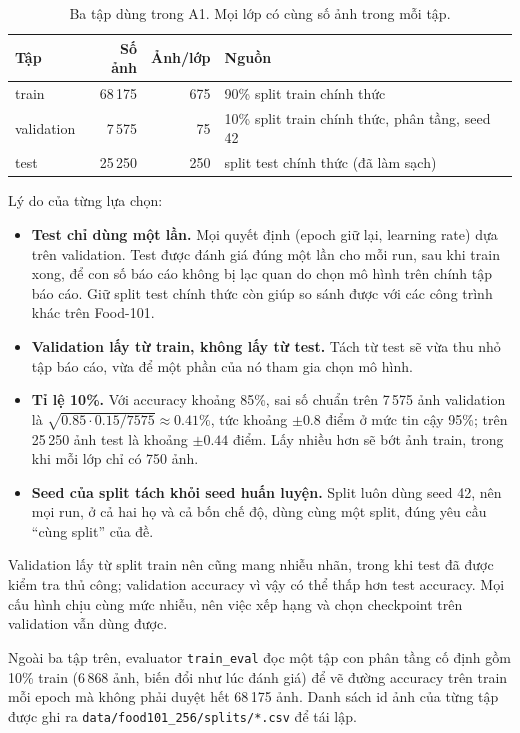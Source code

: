 \begin{table}[htbp]
\centering
\caption{Ba tập dùng trong A1. Mọi lớp có cùng số ảnh trong mỗi tập.}
\label{tab:a1-split}
\small
\begin{tabular}{lrrl}
\toprule
Tập & Số ảnh & Ảnh/lớp & Nguồn \\
\midrule
train & 68\,175 & 675 & 90\% split train chính thức \\
validation & 7\,575 & 75 & 10\% split train chính thức, phân tầng, seed 42 \\
test & 25\,250 & 250 & split test chính thức (đã làm sạch) \\
\bottomrule
\end{tabular}
\end{table}

Lý do của từng lựa chọn:
\begin{itemize}
\item \textbf{Test chỉ dùng một lần.} Mọi quyết định (epoch giữ lại, learning rate) dựa trên validation. Test được đánh giá đúng một lần cho mỗi run, sau khi train xong, để con số báo cáo không bị lạc quan do chọn mô hình trên chính tập báo cáo. Giữ split test chính thức còn giúp so sánh được với các công trình khác trên Food-101.
\item \textbf{Validation lấy từ train, không lấy từ test.} Tách từ test sẽ vừa thu nhỏ tập báo cáo, vừa để một phần của nó tham gia chọn mô hình.
\item \textbf{Tỉ lệ 10\%.} Với accuracy khoảng 85\%, sai số chuẩn trên 7\,575 ảnh validation là \(\sqrt{0.85\cdot0.15/7575}\approx0.41\%\), tức khoảng \(\pm0.8\) điểm ở mức tin cậy 95\%; trên 25\,250 ảnh test là khoảng \(\pm0.44\) điểm. Lấy nhiều hơn sẽ bớt ảnh train, trong khi mỗi lớp chỉ có 750 ảnh.
\item \textbf{Seed của split tách khỏi seed huấn luyện.} Split luôn dùng seed 42, nên mọi run, ở cả hai họ và cả bốn chế độ, dùng cùng một split, đúng yêu cầu ``cùng split'' của đề.
\end{itemize}

Validation lấy từ split train nên cũng mang nhiễu nhãn, trong khi test đã được kiểm tra thủ công; validation accuracy vì vậy có thể thấp hơn test accuracy. Mọi cấu hình chịu cùng mức nhiễu, nên việc xếp hạng và chọn checkpoint trên validation vẫn dùng được.

Ngoài ba tập trên, evaluator \texttt{train\_eval} đọc một tập con phân tầng cố định gồm 10\% train (6\,868 ảnh, biến đổi như lúc đánh giá) để vẽ đường accuracy trên train mỗi epoch mà không phải duyệt hết 68\,175 ảnh. Danh sách id ảnh của từng tập được ghi ra \texttt{data/food101\_256/splits/*.csv} để tái lập.


